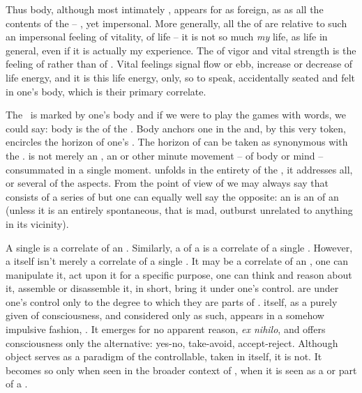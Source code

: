 Thus body, although most intimately , appears for  as foreign, as  as all the contents of the  --
, yet impersonal.  More generally, all the  of 
are relative to such an impersonal feeling of vitality, of life -- it is not so
much {\em my} life, as life in general, even if it is actually my experience.
The  of vigor and vital strength is the feeling of 
rather than of . Vital feelings signal flow or ebb, increase
or decrease of life energy, and it is this life energy, only, so to speak,
accidentally seated and felt in one's body, which is their primary correlate.

 

\pa The \hoa\ is marked by one's body and if we were to play the games with
words, we could say: body is the  of the \hoa.  Body anchors one in the
 and, by this very token, encircles the horizon of one's
.  The horizon of  can be taken as synonymous with the
\hoa.   is not merely an , an   or
other minute movement -- of body or mind -- consummated in a single moment.
 unfolds in the entirety of the \hoa, it addresses all, or several of
the  aspects. From the point of view of  we
may always say that  consists of a series of  but one can
equally well say the opposite: an  is an  of an 
(unless it is an entirely spontaneous, that is mad, outburst unrelated to
anything in its vicinity).

A single  is a correlate of an . Similarly, a  of a
 is a correlate of a single . However, a 
itself isn't merely a correlate of a single . It may be a correlate of
an , one can manipulate it, act upon it for a specific purpose, one
can think and reason about it, assemble or disassemble it, in short, bring it
under one's control.   are under one's control only to the degree to
which they are parts of .  itself, as a purely
 given of consciousness, and considered only as such, appears in a
somehow impulsive fashion, .  It emerges for no apparent
reason, {\em ex nihilo}, and offers consciousness only the
 alternative: yes-no, take-avoid, accept-reject. Although object
serves as a paradigm of the controllable, taken in itself, it is not. It
becomes so only when seen in the broader context of , when it is
seen as a  or part of a .

